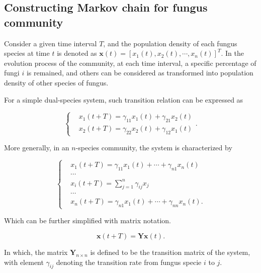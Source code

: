 \subsection{Constructing Markov chain for fungus community}

Consider a given time interval $T$, and the population density of each fungus species at time $t$ is denoted as $\boldsymbol{x}(t) = [x_1(t), x_2(t), \cdots, x_n(t)]^T$. In the evolution process of the community, at each time interval, a specific percentage of fungi $i$ is remained, and others can be considered as transformed into population density of other species of fungus.

For a simple dual-species system, such transition relation can be expressed as


\begin{equation}
    \left\{\begin{aligned} &
        x_1(t+T) = \gamma_{11}x_1(t) + \gamma_{21}x_2(t) \\ &
        x_2(t+T) = \gamma_{22}x_2(t) + \gamma_{12}x_1(t)
    \end{aligned}\right..
\end{equation}

More generally, in an $n$-species community, the system is characterized by

\begin{equation}
    \left\{\begin{aligned} &
        x_1(t+T) = \gamma_{11}x_1(t) + \cdots + \gamma_{n1}x_n(t) \\ & \cdots \\ &
        x_i(t+T) = \sum_{j=1}^n \gamma_{ij}x_j \\ & \cdots \\ &
        x_n(t+T) = \gamma_{n1}x_1(t) + \cdots + \gamma_{nn}x_n(t).
    \end{aligned}\right.
\end{equation}

Which can be further simplified with matrix notation.

\begin{equation}\label{eq:trans}
    \boldsymbol{x}(t+T) = \boldsymbol{Y}\boldsymbol{x}(t).
\end{equation}

In which, the matrix $\boldsymbol{Y}_{n\times n}$ is defined to be the transition matrix of the system, with element $\gamma_{ij}$ denoting the transition rate from fungus specie $i$ to $j$.

